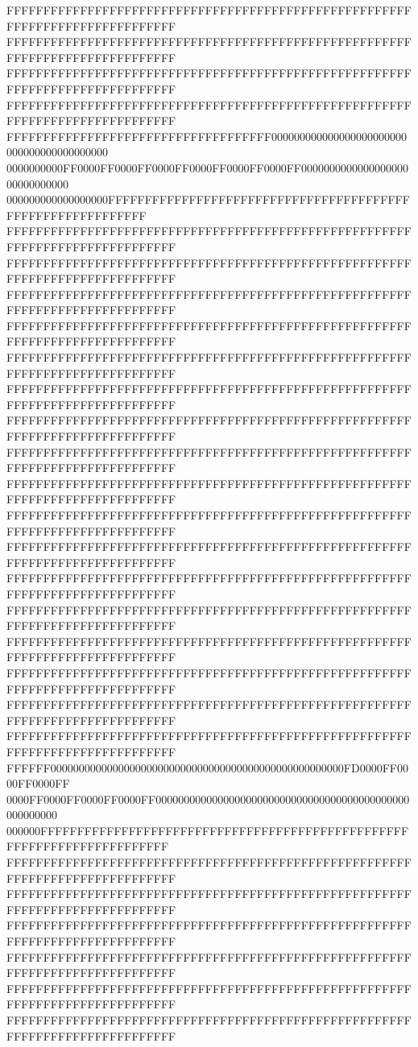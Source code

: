 FFFFFFFFFFFFFFFFFFFFFFFFFFFFFFFFFFFFFFFFFFFFFFFFFFFFFFFFFFFFFFFFFFFFFFFFFFFFFF
FFFFFFFFFFFFFFFFFFFFFFFFFFFFFFFFFFFFFFFFFFFFFFFFFFFFFFFFFFFFFFFFFFFFFFFFFFFFFF
FFFFFFFFFFFFFFFFFFFFFFFFFFFFFFFFFFFFFFFFFFFFFFFFFFFFFFFFFFFFFFFFFFFFFFFFFFFFFF
FFFFFFFFFFFFFFFFFFFFFFFFFFFFFFFFFFFFFFFFFFFFFFFFFFFFFFFFFFFFFFFFFFFFFFFFFFFFFF
FFFFFFFFFFFFFFFFFFFFFFFFFFFFFFFFFFFF000000000000000000000000000000000000000000
0000000000FF0000FF0000FF0000FF0000FF0000FF0000FF000000000000000000000000000000
000000000000000000FFFFFFFFFFFFFFFFFFFFFFFFFFFFFFFFFFFFFFFFFFFFFFFFFFFFFFFFFFFF
FFFFFFFFFFFFFFFFFFFFFFFFFFFFFFFFFFFFFFFFFFFFFFFFFFFFFFFFFFFFFFFFFFFFFFFFFFFFFF
FFFFFFFFFFFFFFFFFFFFFFFFFFFFFFFFFFFFFFFFFFFFFFFFFFFFFFFFFFFFFFFFFFFFFFFFFFFFFF
FFFFFFFFFFFFFFFFFFFFFFFFFFFFFFFFFFFFFFFFFFFFFFFFFFFFFFFFFFFFFFFFFFFFFFFFFFFFFF
FFFFFFFFFFFFFFFFFFFFFFFFFFFFFFFFFFFFFFFFFFFFFFFFFFFFFFFFFFFFFFFFFFFFFFFFFFFFFF
FFFFFFFFFFFFFFFFFFFFFFFFFFFFFFFFFFFFFFFFFFFFFFFFFFFFFFFFFFFFFFFFFFFFFFFFFFFFFF
FFFFFFFFFFFFFFFFFFFFFFFFFFFFFFFFFFFFFFFFFFFFFFFFFFFFFFFFFFFFFFFFFFFFFFFFFFFFFF
FFFFFFFFFFFFFFFFFFFFFFFFFFFFFFFFFFFFFFFFFFFFFFFFFFFFFFFFFFFFFFFFFFFFFFFFFFFFFF
FFFFFFFFFFFFFFFFFFFFFFFFFFFFFFFFFFFFFFFFFFFFFFFFFFFFFFFFFFFFFFFFFFFFFFFFFFFFFF
FFFFFFFFFFFFFFFFFFFFFFFFFFFFFFFFFFFFFFFFFFFFFFFFFFFFFFFFFFFFFFFFFFFFFFFFFFFFFF
FFFFFFFFFFFFFFFFFFFFFFFFFFFFFFFFFFFFFFFFFFFFFFFFFFFFFFFFFFFFFFFFFFFFFFFFFFFFFF
FFFFFFFFFFFFFFFFFFFFFFFFFFFFFFFFFFFFFFFFFFFFFFFFFFFFFFFFFFFFFFFFFFFFFFFFFFFFFF
FFFFFFFFFFFFFFFFFFFFFFFFFFFFFFFFFFFFFFFFFFFFFFFFFFFFFFFFFFFFFFFFFFFFFFFFFFFFFF
FFFFFFFFFFFFFFFFFFFFFFFFFFFFFFFFFFFFFFFFFFFFFFFFFFFFFFFFFFFFFFFFFFFFFFFFFFFFFF
FFFFFFFFFFFFFFFFFFFFFFFFFFFFFFFFFFFFFFFFFFFFFFFFFFFFFFFFFFFFFFFFFFFFFFFFFFFFFF
FFFFFFFFFFFFFFFFFFFFFFFFFFFFFFFFFFFFFFFFFFFFFFFFFFFFFFFFFFFFFFFFFFFFFFFFFFFFFF
FFFFFFFFFFFFFFFFFFFFFFFFFFFFFFFFFFFFFFFFFFFFFFFFFFFFFFFFFFFFFFFFFFFFFFFFFFFFFF
FFFFFFFFFFFFFFFFFFFFFFFFFFFFFFFFFFFFFFFFFFFFFFFFFFFFFFFFFFFFFFFFFFFFFFFFFFFFFF
FFFFFF0000000000000000000000000000000000000000000000000000FD0000FF0000FF0000FF
0000FF0000FF0000FF0000FF000000000000000000000000000000000000000000000000000000
000000FFFFFFFFFFFFFFFFFFFFFFFFFFFFFFFFFFFFFFFFFFFFFFFFFFFFFFFFFFFFFFFFFFFFFFFF
FFFFFFFFFFFFFFFFFFFFFFFFFFFFFFFFFFFFFFFFFFFFFFFFFFFFFFFFFFFFFFFFFFFFFFFFFFFFFF
FFFFFFFFFFFFFFFFFFFFFFFFFFFFFFFFFFFFFFFFFFFFFFFFFFFFFFFFFFFFFFFFFFFFFFFFFFFFFF
FFFFFFFFFFFFFFFFFFFFFFFFFFFFFFFFFFFFFFFFFFFFFFFFFFFFFFFFFFFFFFFFFFFFFFFFFFFFFF
FFFFFFFFFFFFFFFFFFFFFFFFFFFFFFFFFFFFFFFFFFFFFFFFFFFFFFFFFFFFFFFFFFFFFFFFFFFFFF
FFFFFFFFFFFFFFFFFFFFFFFFFFFFFFFFFFFFFFFFFFFFFFFFFFFFFFFFFFFFFFFFFFFFFFFFFFFFFF
FFFFFFFFFFFFFFFFFFFFFFFFFFFFFFFFFFFFFFFFFFFFFFFFFFFFFFFFFFFFFFFFFFFFFFFFFFFFFF

